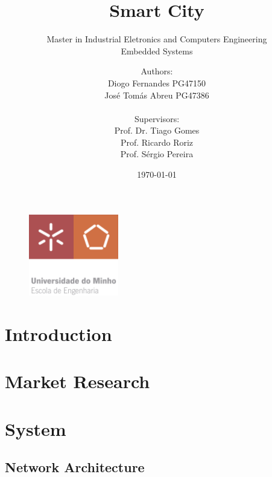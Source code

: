 \documentclass[12pt, letterpaper]{report}
\title{\textbf{Smart City}}
\subtitle{{\large Master in Industrial Eletronics and Computers Engineering} \\ {\large Embedded Systems}}
\author{Authors:\\Diogo Fernandes PG47150\\José Tomás Abreu PG47386\\ \\ Supervisors:\\Prof. Dr. Tiago Gomes\\Prof. Ricardo Roriz\\Prof. Sérgio Pereira}
\date{\today}
\begin{document}
{\begin{figure}[t]
	\centering
	\includegraphics[width=0.35\textwidth]{EEUMLOGO}
\end{figure}}

\maketitle

\cleardoublepage
\pagestyle{empty}

\tableofcontents
\clearpage

\clearpage
{}\listoffigures

\clearpage
{}\listoftables

\clearpage
{}
\printacronyms

\newpage


\pagestyle{IHA-fancy-style}
\chapter{Introduction}


\chapter{Market Research}


\chapter{System}
\section{Network Architecture}

\end{document}

